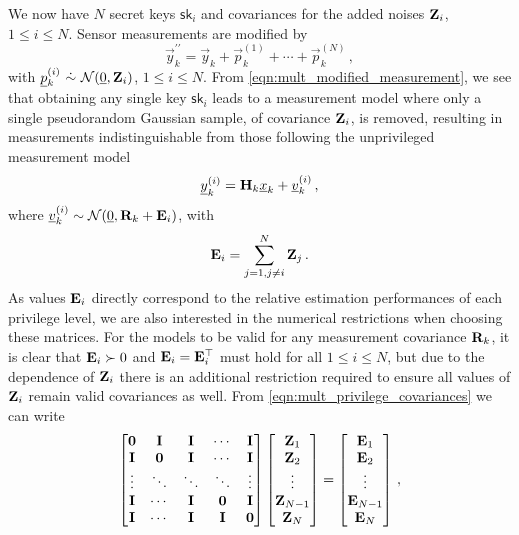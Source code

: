 \documentclass[letterpaper, 10 pt, conference]{ieeeconf}
\begin{document}
We now have $N$ secret keys $\mathsf{sk}_i$ and covariances for the added noises ${{\mathbf{Z}}}_i$, $1\leq i \leq N$. Sensor measurements are modified by
\begin{equation}\label{eqn:mult_modified_measurement}
   \vec{y}_k^{\prime\prime} = \vec{y}_k + \vec{p}^{(1)}_k + \cdots + \vec{p}^{(N)}_k\,,
\end{equation}
with $\vec{p}^{(i)}_k\ \dot{\sim}\ \mathcal{N}(\vec{0}, \mat{Z}_i)$, $1\leq i \leq N$. From \eqref{eqn:mult_modified_measurement}, we see that obtaining any single key $\mathsf{sk}_i$ leads to a measurement model where only a single pseudorandom Gaussian sample, of covariance ${{\mathbf{Z}}}_i$, is removed, resulting in measurements indistinguishable from those following the unprivileged measurement model
\begin{equation}
   {\underline{y}}_k^{(i)} = {{\mathbf{H}}}_k{\underline{x}}_k + {\underline{v}}^{(i)}_k\,,
\end{equation}
where ${\underline{v}}^{(i)}_k\sim \mathcal{N}({\underline{0}},{{\mathbf{R}}}_k+{{\mathbf{E}}}_i)$, with
\begin{equation}\label{eqn:mult_privilege_covariances}
   {\ensuremath{{\mathbf{E}}}}_i = \sum^N_{j=1,j \neq i}{{\mathbf{Z}}}_j\,.
\end{equation}
As values ${{\mathbf{E}}}_i$ directly correspond to the relative estimation performances of each privilege level, we are also interested in the numerical restrictions when choosing these matrices. For the models to be valid for any measurement covariance ${{\mathbf{R}}}_k$, it is clear that ${{\mathbf{E}}}_i\succ 0$ and ${{\mathbf{E}}}_i={{\mathbf{E}}}_i^\top$ must hold for all $1\leq i\leq N$, but due to the dependence of ${{\mathbf{Z}}}_i$ there is an additional restriction required to ensure all values of ${{\mathbf{Z}}}_i$ remain valid covariances as well. From \eqref{eqn:mult_privilege_covariances} we can write
\begin{equation}
   \begin{bmatrix}
      {\ensuremath{{\mathbf{0}}}} & {{\mathbf{I}}} & {{\mathbf{I}}} & \cdots & {{\mathbf{I}}}\\
      {{\mathbf{I}}} & {{\mathbf{0}}} & {{\mathbf{I}}} & \cdots & {{\mathbf{I}}}\\
      \vdots & \ddots & \ddots & \ddots & \vdots\\
      {{\mathbf{I}}} & \cdots & {{\mathbf{I}}} & {{\mathbf{0}}} & {{\mathbf{I}}}\\
      {{\mathbf{I}}} & \cdots & {{\mathbf{I}}} & {{\mathbf{I}}} & {{\mathbf{0}}}
   \end{bmatrix}
   \begin{bmatrix}
      {\ensuremath{{\mathbf{Z}}}}_1\\
      {{\mathbf{Z}}}_2\\
      \vdots\\
      {{\mathbf{Z}}}_{N-1}\\
      {{\mathbf{Z}}}_N
   \end{bmatrix}
   =
   \begin{bmatrix}
      {\ensuremath{{\mathbf{E}}}}_1\\
      {{\mathbf{E}}}_2\\
      \vdots\\
      {{\mathbf{E}}}_{N-1}\\
      {{\mathbf{E}}}_N
   \end{bmatrix}\,,
\end{equation}
\end{document}
